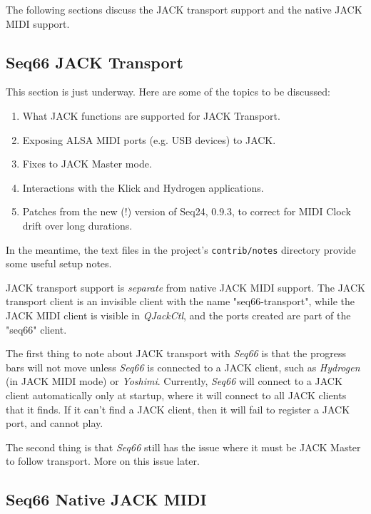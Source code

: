    The following sections discuss the JACK transport support and the native
   JACK MIDI support.

\subsection{Seq66 JACK Transport}
\label{subsec:jack_transport}

   This section is just underway.  Here are some of the topics to be discussed:

   \begin{enumerate}
      \item What JACK functions are supported for JACK Transport.
      \item Exposing ALSA MIDI ports (e.g. USB devices) to JACK.
      \item Fixes to JACK Master mode.
      \item Interactions with the Klick and Hydrogen applications.
      \item Patches from the new (!) version of Seq24, 0.9.3, to correct
         for MIDI Clock drift over long durations.
   \end{enumerate}

   In the meantime, the text files in the project's \texttt{contrib/notes}
   directory provide some useful setup notes.

   JACK transport support is \textsl{separate} from native JACK MIDI support.
   The JACK transport client is an invisible client with the
   name "seq66-transport", while the JACK MIDI client is visible in
   \textsl{QJackCtl}, and the ports created are part of the
   "seq66" client.

   The first thing to note about JACK transport with \textsl{Seq66} is
   that the progress bars will not move unless \textsl{Seq66} is
   connected to a JACK client, such as \textsl{Hydrogen} (in JACK MIDI mode)
   or \textsl{Yoshimi}.  Currently, \textsl{Seq66} will connect to a JACK
   client automatically only at startup, where it will connect to all JACK
   clients that it finds.  If it can't find a JACK client, then it will
   fail to register a JACK port, and cannot play.

   The second thing is that \textsl{Seq66} still has the issue where it
   must be JACK Master to follow transport.  More on this issue later.

\subsection{Seq66 Native JACK MIDI}
\label{subsec:jack_native_midi}

